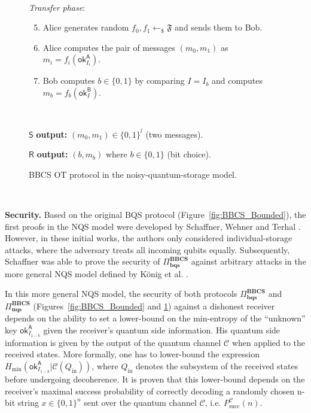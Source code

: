 \begin{figure}[h!]
\begin{tcolorbox}
    \
    
    \textit{Transfer phase}:
            \begin{enumerate}
            \setcounter{enumi}{4}
                \item Alice generates random $f_0, f_1 \leftarrow_{\$}\mathfrak{F}$ and sends them to Bob.
                \item Alice computes the pair of messages $(m_0, m_1)$ as $m_i = f_i(\mathsf{ok}^{\mathsf{A}}_{I_{i}})$.
                \item Bob computes $b\in\{0, 1\}$ by comparing $I = I_b$ and computes $m_b = f_b(\mathsf{ok}^{\mathsf{B}}_{I})$. 
            \end{enumerate}
    
    
   
    
    \
    
$\mathsf{S}$ \textbf{output:} $(m_0, m_1)\in\{0,1\}^l$ (two messages).

$\mathsf{R}$ \textbf{output:} $(b, m_b)$ where $b\in\{0,1\}$ (bit choice).
    
\end{tcolorbox}
    \caption{BBCS OT protocol in the noisy-quantum-storage model.}
    \label{fig:BBCS_Noisy}
\end{figure}


\

\noindent\textbf{Security.} Based on the original BQS protocol (Figure~\ref{fig:BBCS_Bounded}), the first proofs in the NQS model were developed by Schaffner, Wehner and Terhal \cite{WST08, STW09}. However, in these initial works, the authors only considered individual-storage attacks, where the adversary treats all incoming qubits equally. Subsequently, Schaffner \cite{S10} was able to prove the security of $\Pi^{\textbf{BBCS}}_{\textbf{bqs}}$ against arbitrary attacks in the more general NQS model defined by K\"onig et al. \cite{KWW12}. 

In this more general NQS model, the security of both protocols $\Pi^{\textbf{BBCS}}_{\textbf{bqs}}$ and $\Pi^{\textbf{BBCS}}_{\textbf{nqs}}$ (Figures~\ref{fig:BBCS_Bounded} and \ref{fig:BBCS_Noisy}) against a dishonest receiver depends on the ability to set a lower-bound on the min-entropy of the ``unknown'' key $\mathsf{ok}^{\mathsf{A}}_{I_{1-b}}$ given the receiver's quantum side information. His quantum side information is given by the output of the quantum channel $\mathcal{C}$ when applied to the received states. More formally, one has to lower-bound the expression $H_{\text{min}}\left(\mathsf{ok}^{\mathsf{A}}_{I_{1-b}} | \mathcal{C}\left(Q_{\text{in}}\right)\right)$, where $Q_{\text{in}}$ denotes the subsystem of the received states before undergoing decoherence. It is proven \cite{KWW12} that this lower-bound depends on the receiver's maximal success probability of correctly decoding a randomly chosen n-bit string $x \in \{0,1\}^n$ sent over the quantum
channel $\mathcal{C}$, i.e. $P^{\mathcal{C}}_{\text{succ}}(n)$. %

